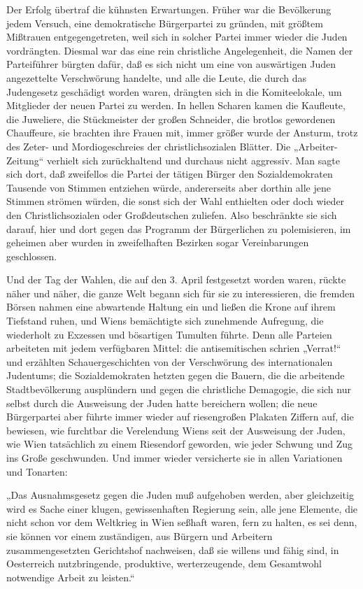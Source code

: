 Der Erfolg übertraf die kühnsten Erwartungen. Früher war die
Bevölkerung jedem Versuch, eine demokratische Bürgerpartei zu
gründen, mit größtem Mißtrauen entgegengetreten, weil sich in
solcher Partei immer wieder die Juden vordrängten. Diesmal war das
eine rein christliche Angelegenheit, die Namen der Parteiführer
bürgten dafür, daß es sich nicht um eine von auswärtigen Juden
angezettelte Verschwörung handelte, und alle die Leute, die durch
das Judengesetz geschädigt worden waren, drängten sich in die
Komiteelokale, um Mitglieder der neuen Partei zu werden.
 In hellen Scharen kamen die Kaufleute, die
Juweliere, die Stückmeister der großen Schneider, die brotlos
gewordenen Chauffeure, sie brachten ihre Frauen mit, immer größer
wurde der Ansturm, trotz des Zeter- und Mordiogeschreies der
christlichsozialen Blätter. Die „Arbeiter-Zeitung“ verhielt sich
zurückhaltend und durchaus nicht aggressiv. Man sagte sich dort,
daß zweifellos die Partei der tätigen Bürger den Sozialdemokraten
Tausende von Stimmen entziehen würde, andererseits aber dorthin
alle jene Stimmen strömen würden, die sonst sich der Wahl
enthielten oder doch wieder den Christlichsozialen oder
Großdeutschen zuliefen. Also beschränkte sie sich darauf, hier und
dort gegen das Programm der Bürgerlichen zu polemisieren, im
geheimen aber wurden in zweifelhaften Bezirken sogar Vereinbarungen
geschlossen.

Und der Tag der Wahlen, die auf den 3. April festgesetzt worden
waren, rückte näher und näher, die ganze Welt begann sich für sie
zu interessieren, die fremden Börsen nahmen eine abwartende Haltung
ein und ließen die Krone auf ihrem Tiefstand ruhen, und Wiens
bemächtigte sich zunehmende Aufregung, die wiederholt zu Exzessen
und bösartigen Tumulten führte. Denn alle Parteien arbeiteten mit
jedem verfügbaren Mittel: die antisemitischen schrien „Verrat!“ und
erzählten Schauergeschichten von der Verschwörung des
internationalen Judentums; die Sozialdemokraten hetzten gegen die
Bauern, die die arbeitende Stadtbevölkerung ausplündern und gegen
die christliche Demagogie, die sich nur selbst durch die Ausweisung
der Juden hatte bereichern wollen; die neue Bürgerpartei aber
führte immer wieder  auf riesengroßen Plakaten
Ziffern auf, die bewiesen, wie furchtbar die Verelendung Wiens seit
der Ausweisung der Juden, wie Wien tatsächlich zu einem Riesendorf
geworden, wie jeder Schwung und Zug ins Große geschwunden. Und
immer wieder versicherte sie in allen Variationen und Tonarten:

„Das Ausnahmsgesetz gegen die Juden muß aufgehoben werden, aber
gleichzeitig wird es Sache einer klugen, gewissenhaften Regierung
sein, alle jene Elemente, die nicht schon vor dem Weltkrieg in Wien
seßhaft waren, fern zu halten, es sei denn, sie können vor einem
zuständigen, aus Bürgern und Arbeitern zusammengesetzten
Gerichtshof nachweisen, daß sie willens und fähig sind, in
Oesterreich nutzbringende, produktive, werterzeugende, dem
Gesamtwohl notwendige Arbeit zu leisten.“

